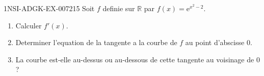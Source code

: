 \begin{exercice}{1NSI-ADGK-EX-007}{2}{15}
Soit $f$ definie sur $\mathbb{R}$ par $f(x) = \mathrm{e}^{x^2 - 2}$.
\begin{enumerate}
  \item Calculer $f'(x)$.
  \item Determiner l'equation de la tangente a la courbe de $f$ au point d'abscisse $0$.
  \item La courbe est-elle au-dessus ou au-dessous de cette tangente au voisinage de $0$ ?
\end{enumerate}

\end{exercice}

